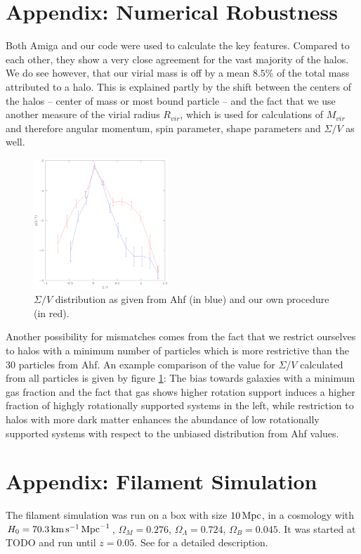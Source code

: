\documentclass[useAMS,usenatbib]{mn2e}
\begin{document}
\section{Appendix: Numerical Robustness}
%
Both {\sc Amiga} and our code were used to calculate the key features. Compared to each other, they show a very close agreement for the vast majority
of the halos.
%
We do see however, that our virial mass is off by a mean $8.5\%$ of the total
mass attributed to a halo. This is explained partly by the shift between the
centers of the halos -- center of mass or most bound particle -- and the fact
that we use another measure of the virial radius $R_{vir}$, which is used for
calculations of $M_{vir}$ and therefore angular momentum, spin parameter,
shape parameters and $\Sigma/V$ as well.
%
%
\begin{figure}
  \begin{center}
    \includegraphics[width=0.45\textwidth]{fig/sigmav_ahf_hp/out.eps}
  \end{center}

  \caption{ \label{fig:sigmav_ahf_hp} $\Sigma/V$ distribution as given from
    {\sc Ahf} (in blue) and our own procedure (in red).}
\end{figure}
%
%
Another possibility for mismatches comes from the fact that we restrict
ourselves to halos with a minimum number of particles which is more
restrictive than the 30 particles from {\sc Ahf}. An example comparison of the
value for $\Sigma/V$ calculated from all particles is given by figure
\ref{fig:sigmav_ahf_hp}: The bias towards galaxies with a minimum gas fraction
and the fact that gas shows higher rotation support induces a higher fraction
of highgly rotationally supported systems in the left, while restriction to
halos with more dark matter enhances the abundance of low rotationally
supported systems with respect to the unbiased distribution from {\sc Ahf}
values.
%
%
\section{Appendix: Filament Simulation}
The filament simulation was run on a box with size $10\,{\rm Mpc}$, in
a cosmology with $H_0=70.3\,{\rm km}\,{\rm s}^{-1}\,{\rm Mpc}^{-1}$,
$\Omega_M=0.276$, $\Omega_\Lambda=0.724$, $\Omega_B=0.045$. It was
started at TODO and run until $z=0.05$. See \cite{Hahn2010} for a
detailed description.
\end{document}
